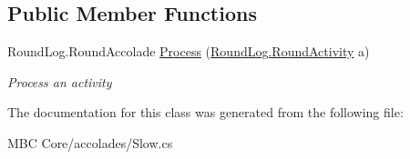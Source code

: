 \subsection*{Public Member Functions}
\begin{DoxyCompactItemize}
\item 
\hypertarget{class_m_b_c_1_1_core_1_1mbc_1_1accolades_1_1_slow_ae6faa3fda393b31a1dde5e0be7f40a43}{Round\-Log.\-Round\-Accolade \hyperlink{class_m_b_c_1_1_core_1_1mbc_1_1accolades_1_1_slow_ae6faa3fda393b31a1dde5e0be7f40a43}{Process} (\hyperlink{class_m_b_c_1_1_core_1_1_round_log_1_1_round_activity}{Round\-Log.\-Round\-Activity} a)}\label{class_m_b_c_1_1_core_1_1mbc_1_1accolades_1_1_slow_ae6faa3fda393b31a1dde5e0be7f40a43}

\begin{DoxyCompactList}\small\item\em Process an activity\end{DoxyCompactList}\end{DoxyCompactItemize}


The documentation for this class was generated from the following file\-:\begin{DoxyCompactItemize}
\item 
M\-B\-C Core/accolades/Slow.\-cs\end{DoxyCompactItemize}
